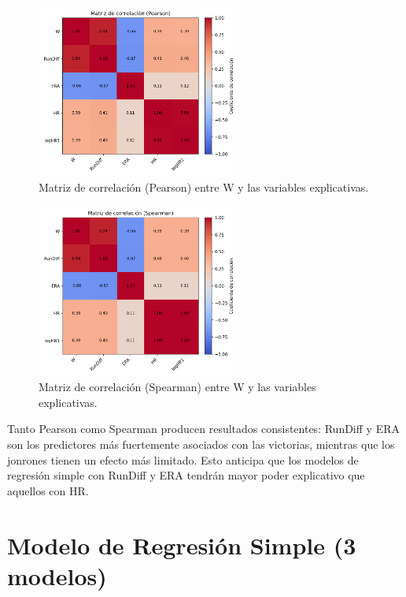 \documentclass[10pt]{article}
\begin{document}
\begin{figure}[H]
    \centering
    \includegraphics[width=0.6\textwidth]{../plots/heatmap_corr_pearson.png}
    \caption{Matriz de correlación (Pearson) entre W y las variables explicativas.}
    \label{fig:heatmap_pearson}
\end{figure}

\begin{figure}[H]
    \centering
    \includegraphics[width=0.6\textwidth]{../plots/heatmap_corr_spearman.png}
    \caption{Matriz de correlación (Spearman) entre W y las variables explicativas.}
    \label{fig:heatmap_spearman}
\end{figure}

Tanto Pearson como Spearman producen resultados consistentes: RunDiff y ERA son los predictores más fuertemente asociados con las victorias, mientras que los jonrones tienen un efecto más limitado. Esto anticipa que los modelos de regresión simple con RunDiff y ERA tendrán mayor poder explicativo que aquellos con HR.
\section{Modelo de Regresión Simple (3 modelos)}
\end{document}
